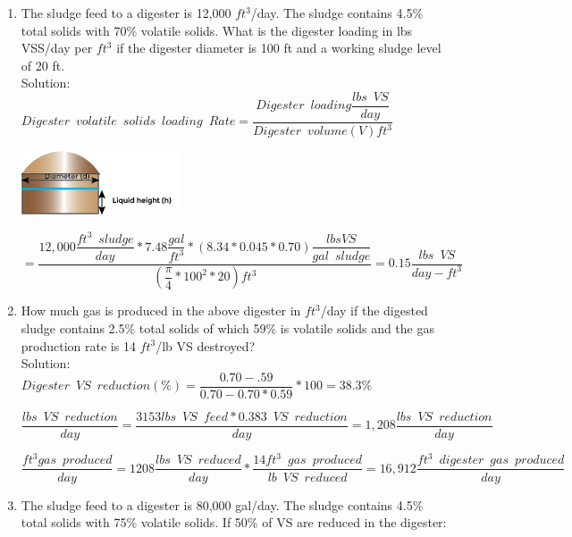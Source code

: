 \documentclass{article}
\begin{document}
\begin{enumerate}
\item The sludge feed to a digester is 12,000 $ft^3$/day.  The sludge contains 4.5\% total solids with 70\% volatile solids.  What is the digester loading in lbs VSS/day per $ft^3$ if the digester diameter is 100 ft and a working sludge level of 20 ft.\\
	
Solution:\\
{
$
	Digester \enspace volatile \enspace solids 			\enspace loading \enspace Rate = 					\dfrac
	{
	Digester \enspace loading 
		\dfrac
		{
		lbs \enspace VS
		}
		{
		day
		}
	}
	{
	Digester \enspace volume (V)ft^3
	}
$
}\\

\begin{center}
\includegraphics[scale=1]{DigesterWOCDimensions_1}
\end{center}

{
$=\dfrac
	{
		12,000
		\dfrac
			{
			ft^3 \enspace sludge
			}
			{
			day
			}
		*7.48 \dfrac
				{
				gal
				}
				{
				ft^3
				}	
		*(8.34*0.045*0.70) 
		\dfrac
			{lbs VS}
			{gal \enspace  sludge}
	}
	{
		(	\dfrac
			{
			\pi
			}
			{
			4
			}
			*100^2*20
		)
		ft^3
	}
=\boxed
	{
		0.15 \dfrac
			{
			lbs \enspace VS
			}
			{
			day-ft^3
			}
	}
$}\\
\item How much gas is produced in the above digester in $ft^3$/day if the digested sludge contains 2.5\% total solids of which 59\% is volatile solids and the gas production rate is 14 $ft^3$/lb VS destroyed?\\
Solution:\\

{
$
Digester \enspace VS \enspace reduction (\%)=
	\dfrac
	{0.70 - .59}
	{0.70 - 0.70 *0.59}
	*100=38.3\%
$
}\\
\vspace{6mm}

{
$
	\dfrac
	{
	lbs \enspace VS \enspace reduction
	}
	{
	day
	}
	=
	\dfrac
	{
	3153 lbs \enspace VS \enspace feed
		*  0.383 \enspace VS \enspace reduction
	}
	{
	day
	}
 	=1,208
	\dfrac
	{
	lbs \enspace VS \enspace reduction
	}
	{
	day 
	}
$
}\\
\vspace{6mm}

{
$
	\dfrac 
	{
	ft^3 gas \enspace produced
	}
	{
	day
	}
	=
	1208 \dfrac
			{
			lbs \enspace VS \enspace reduced
			}
			{
			day
			}
			*
		\dfrac
		{
		14 ft^3 \enspace gas \enspace produced
		}
		{
		lb \enspace VS \enspace reduced
		}
		=16,912 \dfrac
				{
				ft^3 \enspace digester \enspace 					gas \enspace produced
				}
				{
				day
				}
$
} 
\item The sludge feed to a digester is 80,000 gal/day. The sludge contains 4.5\% total solids with 75\% volatile solids. If 50\% of VS are reduced in the digester: 




\end{enumerate}
\end{document}
